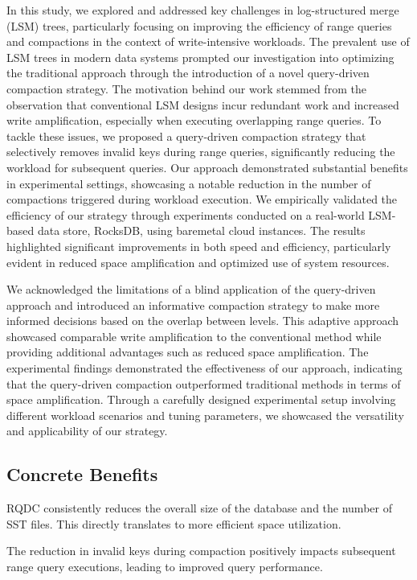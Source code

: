 In this study, we explored and addressed key challenges in log-structured merge (LSM) trees, particularly focusing on 
improving the efficiency of range queries and compactions in the context of write-intensive workloads. The prevalent use 
of LSM trees in modern data systems prompted our investigation into optimizing the traditional approach through the 
introduction of a novel query-driven compaction strategy. The motivation behind our work stemmed from the observation
that conventional LSM designs incur redundant work and increased write amplification, especially when executing 
overlapping range queries. To tackle these issues, we proposed a query-driven compaction strategy that selectively 
removes invalid keys during range queries, significantly reducing the workload for subsequent queries. Our approach 
demonstrated substantial benefits in experimental settings, showcasing a notable reduction in the number of compactions 
triggered during workload execution. We empirically validated the efficiency of our strategy through experiments 
conducted on a real-world LSM-based data store, RocksDB, using baremetal cloud instances. The results highlighted 
significant improvements in both speed and efficiency, particularly evident in reduced space amplification and optimized 
use of system resources.

We acknowledged the limitations of a blind application of the query-driven approach and introduced an informative 
compaction strategy to make more informed decisions based on the overlap between levels. This adaptive approach 
showcased comparable write amplification to the conventional method while providing additional advantages such as 
reduced space amplification. The experimental findings demonstrated the effectiveness of our approach, indicating that 
the query-driven compaction outperformed traditional methods in terms of space amplification. Through a 
carefully designed experimental setup involving different workload scenarios and tuning parameters, we showcased the 
versatility and applicability of our strategy.

\subsection{Concrete Benefits}

RQDC consistently reduces the overall size of the database and the number of SST files. This directly translates to 
more efficient space utilization.

The reduction in invalid keys during compaction positively impacts subsequent range query executions, leading to 
improved query performance.


